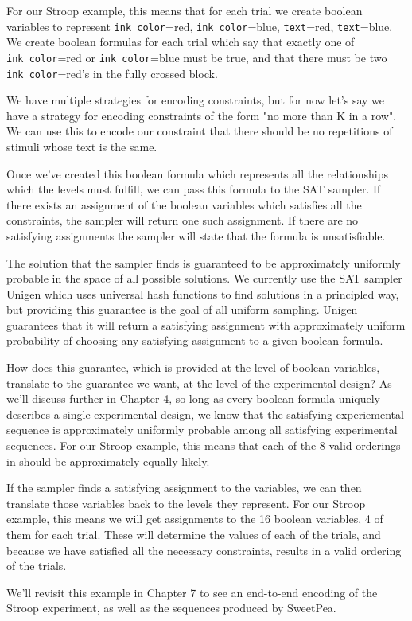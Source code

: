 For our Stroop example, this means that for each trial we create boolean variables to represent \texttt{ink\_color}=red, \texttt{ink\_color}=blue, \texttt{text}=red, \texttt{text}=blue. We create boolean formulas for each trial which say that exactly one of \texttt{ink\_color}=red or \texttt{ink\_color}=blue must be true, and that there must be two \texttt{ink\_color}=red's in the fully crossed block.

We have multiple strategies for encoding constraints, but for now let's say we have a strategy for encoding constraints of the form "no more than K in a row". We can use this to encode our constraint that there should be no repetitions of stimuli whose text is the same.

Once we've created this boolean formula which represents all the relationships which the levels must fulfill, we can pass this formula to the SAT sampler. If there exists an assignment of the boolean variables which satisfies all the constraints, the sampler will return one such assignment. If there are no satisfying assignments the sampler will state that the formula is unsatisfiable.

The solution that the sampler finds is guaranteed to be approximately uniformly probable in the space of all possible solutions. We currently use the SAT sampler Unigen which uses universal hash functions to find solutions in a principled way, but providing this guarantee is the goal of all uniform sampling. Unigen guarantees that it will return a satisfying assignment with approximately uniform probability of choosing any satisfying assignment to a given boolean formula.

How does this guarantee, which is provided at the level of boolean variables, translate to the guarantee we want, at the level of the experimental design? As we'll discuss further in Chapter 4, so long as every boolean formula uniquely describes a single experimental design, we know that the satisfying experiemental sequence is approximately uniformly probable among all satisfying experimental sequences. For our Stroop example, this means that each of the 8 valid orderings in  should be approximately equally likely.

If the sampler finds a satisfying assignment to the variables, we can then translate those variables back to the levels they represent. For our Stroop example, this means we will get assignments to the 16 boolean variables, 4 of them for each trial. These will determine the values of each of the trials, and because we have satisfied all the necessary constraints, results in a valid ordering of the trials.

We'll revisit this example in Chapter 7 to see an end-to-end encoding of the Stroop experiment, as well as the sequences produced by SweetPea.

